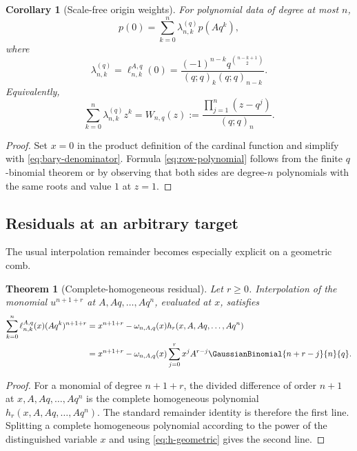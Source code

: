 \documentclass[11pt,oneside]{article}
\numberwithin{equation}{section}
\newtheorem{theorem}{Theorem}[section]
\newtheorem{corollary}[corollary]{Corollary}
\theoremstyle{definition}
\theoremstyle{remark}
\begin{document}
\begin{corollary}[Scale-free origin weights]
For polynomial data of degree at most $n$,
\[
 p(0)=\sum_{k=0}^n\lambda_{n,k}^{(q)}p(Aq^k),
\]
where
\begin{equation}
 \lambda_{n,k}^{(q)}
 =\ell_{n,k}^{A,q}(0)
 =\frac{(-1)^{n-k}q^{\binom{n-k+1}{2}}}
 {(q;q)_k(q;q)_{n-k}}.
 \label{eq:lambda}
\end{equation}
Equivalently,
\begin{equation}
 \sum_{k=0}^n\lambda_{n,k}^{(q)}z^k
 =W_{n,q}(z):=\frac{\prod_{j=1}^n(z-q^j)}{(q;q)_n}.
 \label{eq:row-polynomial}
\end{equation}
\end{corollary}

\begin{proof}
Set $x=0$ in the product definition of the cardinal function and simplify with
\eqref{eq:bary-denominator}.  Formula \eqref{eq:row-polynomial} follows from
the finite $q$-binomial theorem or by observing that both sides are degree-$n$
polynomials with the same roots and value $1$ at $z=1$.
\end{proof}

\subsection{Residuals at an arbitrary target}

The usual interpolation remainder becomes especially explicit on a geometric
comb.

\begin{theorem}[Complete-homogeneous residual]
Let $r\ge0$.  Interpolation of the monomial $u^{n+1+r}$ at
$A,Aq,\ldots,Aq^n$, evaluated at $x$, satisfies
\begin{align}
 \sum_{k=0}^n\ell_{n,k}^{A,q}(x)(Aq^k)^{n+1+r}
 &=x^{n+1+r}-\omega_{n,A,q}(x)
   h_r(x,A,Aq,\ldots,Aq^n)\notag\\
 &=x^{n+1+r}-\omega_{n,A,q}(x)
   \sum_{j=0}^r x^jA^{r-j}\GaussianBinomial{n+r-j}{n}{q}.
 \label{eq:arbitrary-residual}
\end{align}
\end{theorem}

\begin{proof}
For a monomial of degree $n+1+r$, the divided difference of order $n+1$ at
$x,A,Aq,\ldots,Aq^n$ is the complete homogeneous polynomial
$h_r(x,A,Aq,\ldots,Aq^n)$.  The standard remainder identity is therefore the
first line.  Splitting a complete homogeneous polynomial according to the
power of the distinguished variable $x$ and using \eqref{eq:h-geometric}
gives the second line.
\end{proof}
\end{document}
